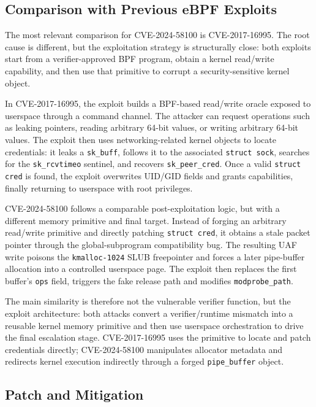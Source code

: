 \documentclass[../main.tex]{subfiles}
\begin{document}
\subsection{Comparison with Previous eBPF Exploits}

The most relevant comparison for CVE-2024-58100 is CVE-2017-16995. The root cause is different, but the exploitation strategy is structurally close: both exploits start from a verifier-approved BPF program, obtain a kernel read/write capability, and then use that primitive to corrupt a security-sensitive kernel object.

In CVE-2017-16995, the exploit builds a BPF-based read/write oracle exposed to userspace through a command channel. The attacker can request operations such as leaking pointers, reading arbitrary 64-bit values, or writing arbitrary 64-bit values. The exploit then uses networking-related kernel objects to locate credentials: it leaks a \texttt{sk\_buff}, follows it to the associated \texttt{struct sock}, searches for the \texttt{sk\_rcvtimeo} sentinel, and recovers \texttt{sk\_peer\_cred}. Once a valid \texttt{struct cred} is found, the exploit overwrites UID/GID fields and grants capabilities, finally returning to userspace with root privileges.

CVE-2024-58100 follows a comparable post-exploitation logic, but with a different memory primitive and final target. Instead of forging an arbitrary read/write primitive and directly patching \texttt{struct cred}, it obtains a stale packet pointer through the global-subprogram compatibility bug. The resulting UAF write poisons the \texttt{kmalloc-1024} SLUB freepointer and forces a later pipe-buffer allocation into a controlled userspace page. The exploit then replaces the first buffer's \texttt{ops} field, triggers the fake release path and modifies \texttt{modprobe\_path}.

The main similarity is therefore not the vulnerable verifier function, but the exploit architecture: both attacks convert a verifier/runtime mismatch into a reusable kernel memory primitive and then use userspace orchestration to drive the final escalation stage. CVE-2017-16995 uses the primitive to locate and patch credentials directly; CVE-2024-58100 manipulates allocator metadata and redirects kernel execution indirectly through a forged \texttt{pipe\_buffer} object.

\subsection{Patch and Mitigation}
\end{document}
